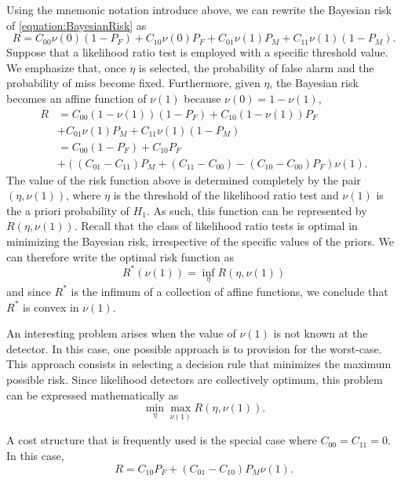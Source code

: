 Using the mnemonic notation introduce above, we can rewrite the Bayesian risk of \eqref{equation:BayesianRisk} as
\begin{equation*}
R = C_{00} \nu(0) (1 - P_F) + C_{10} \nu(0) P_F
+ C_{01} \nu(1) P_M + C_{11} \nu(1) (1 - P_M) .
\end{equation*}
Suppose that a likelihood ratio test is employed with a specific threshold value.
We emphasize that, once $\eta$ is selected, the probability of false alarm and the probability of miss become fixed.
Furthermore, given $\eta$, the Bayesian risk becomes an affine function of $\nu(1)$ because $\nu(0) = 1 - \nu(1)$,
\begin{equation*}
\begin{split}
R &= C_{00} (1 - \nu(1)) (1 - P_F) + C_{10} (1 - \nu(1)) P_F \\
&+ C_{01} \nu(1) P_M + C_{11} \nu(1) (1 - P_M) \\
&= C_{00} (1 - P_F) + C_{10} P_F \\
&+ \left( (C_{01} - C_{11}) P_M + (C_{11} - C_{00})
- (C_{10} - C_{00}) P_F \right) \nu(1) .
\end{split}
\end{equation*}
The value of the risk function above is determined completely by the pair $(\eta, \nu(1))$, where $\eta$ is the threshold of the likelihood ratio test and $\nu(1)$ is the a priori probability of $H_1$.
As such, this function can be represented by $R(\eta, \nu(1))$.
Recall that the class of likelihood ratio tests is optimal in minimizing the Bayesian risk, irrespective of the specific values of the priors.
We can therefore write the optimal risk function as
\begin{equation*}
R^* (\nu(1)) = \inf_{\eta} R(\eta, \nu(1))
\end{equation*}
and since $R^*$ is the infimum of a collection of affine functions, we conclude that $R^*$ is convex in $\nu(1)$.

An interesting problem arises when the value of $\nu(1)$ is not known at the detector.
In this case, one possible approach is to provision for the worst-case.
This approach consists in selecting a decision rule that minimizes the maximum possible risk.
Since likelihood detectors are collectively optimum, this problem can be expressed mathematically as
\begin{equation*}
\min_{\eta} \max_{\nu(1)} R(\eta, \nu(1)) .
\end{equation*}

A cost structure that is frequently used is the special case where $C_{00} = C_{11} = 0$.
In this case,
\begin{equation*}
R = C_{10} P_F + (C_{01} - C_{10}) P_M \nu(1) .
\end{equation*}


